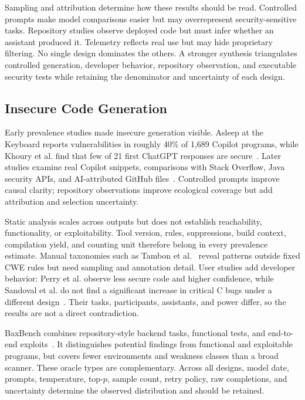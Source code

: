 \documentclass[acmsmall,screen,review]{acmart}
\begin{document}
Sampling and attribution determine how these results should be read. Controlled prompts make model comparisons easier but may overrepresent security-sensitive tasks. Repository studies observe deployed code but must infer whether an assistant produced it. Telemetry reflects real use but may hide proprietary filtering. No single design dominates the others. A stronger synthesis triangulates controlled generation, developer behavior, repository observation, and executable security tests while retaining the denominator and uncertainty of each design.

\subsection{Insecure Code Generation} \label{sec:gensec:insecure}
Early prevalence studies made insecure generation visible. Asleep at the Keyboard reports vulnerabilities in roughly 40\% of 1,689 Copilot programs, while Khoury et al. find that few of 21 first ChatGPT responses are secure~\cite{pearce2022asleep,khoury2023secure}. Later studies examine real Copilot snippets, comparisons with Stack Overflow, Java security APIs, and AI-attributed GitHub files~\cite{fu2023security,hamer2024copy,mousavi2024investigation,largescale2025vulnerabilities}. Controlled prompts improve causal clarity; repository observations improve ecological coverage but add attribution and selection uncertainty.

Static analysis scales across outputs but does not establish reachability, functionality, or exploitability. Tool version, rules, suppressions, build context, compilation yield, and counting unit therefore belong in every prevalence estimate. Manual taxonomies such as Tambon et al.~\cite{tambon2025bugs} reveal patterns outside fixed CWE rules but need sampling and annotation detail. User studies add developer behavior: Perry et al. observe less secure code and higher confidence, while Sandoval et al. do not find a significant increase in critical C bugs under a different design~\cite{perry2023users,sandoval2023lost}. Their tasks, participants, assistants, and power differ, so the results are not a direct contradiction.

BaxBench combines repository-style backend tasks, functional tests, and end-to-end exploits~\cite{baxbench2025}. It distinguishes potential findings from functional and exploitable programs, but covers fewer environments and weakness classes than a broad scanner. These oracle types are complementary. Across all designs, model date, prompts, temperature, top-$p$, sample count, retry policy, raw completions, and uncertainty determine the observed distribution and should be retained.
\end{document}

